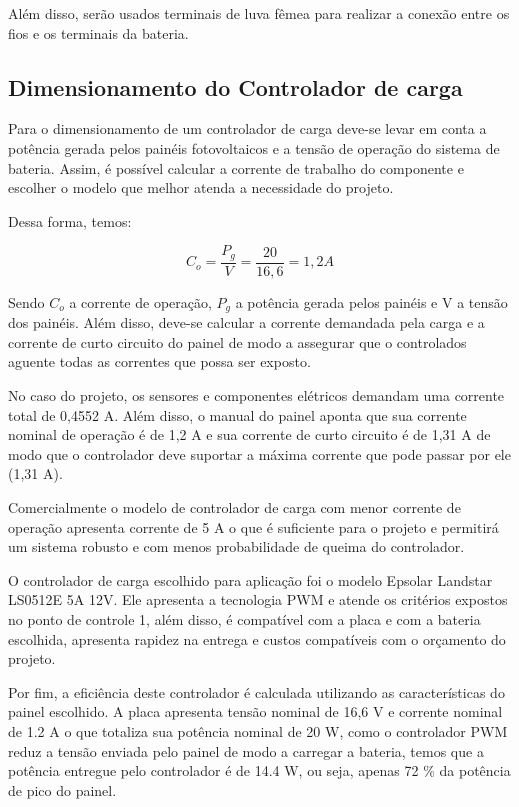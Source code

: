 	Além disso, serão usados terminais de luva fêmea para realizar a conexão entre os fios e os terminais da bateria.

\subsection{Dimensionamento do Controlador de carga}

	Para o dimensionamento de um controlador de carga deve-se levar em conta a potência gerada pelos painéis fotovoltaicos e a tensão de operação do sistema de bateria. Assim, é possível calcular a corrente de trabalho do componente e escolher o modelo que melhor atenda a necessidade do projeto.
	
	Dessa forma, temos:

\begin{equation}
C_o = \dfrac{P_g}{V} = \dfrac{20}{16,6} = 1,2 A
\end{equation}

	Sendo $C_o$ a corrente de operação, $P_g$ a potência gerada pelos painéis e V a tensão dos painéis. Além disso, deve-se calcular a corrente demandada pela carga e a corrente de curto circuito do painel de modo a assegurar que o controlados aguente todas as correntes que possa ser exposto.
	
	No caso do projeto, os sensores e componentes elétricos demandam uma corrente total de 0,4552 A. Além disso, o manual do painel aponta que sua corrente nominal de operação é de 1,2 A e sua corrente de curto circuito é de 1,31 A de modo que o controlador deve suportar a máxima corrente que pode passar por ele (1,31 A).
	
	Comercialmente o modelo de controlador de carga com menor corrente de operação apresenta corrente de 5 A o que é suficiente para o projeto e permitirá um sistema robusto e com menos probabilidade de queima do controlador.
	
	O controlador de carga escolhido para aplicação foi o modelo Epsolar Landstar LS0512E 5A 12V. Ele apresenta a tecnologia PWM e atende os critérios expostos no ponto de controle 1, além disso, é compatível com a placa e com a bateria escolhida, apresenta rapidez na entrega e custos compatíveis com o orçamento do projeto.
	
	Por fim, a eficiência deste controlador é calculada utilizando as características do painel escolhido. A placa apresenta tensão nominal de 16,6 V e corrente nominal de 1.2 A o que totaliza sua potência nominal de 20 W, como o controlador PWM reduz a tensão enviada pelo painel de modo a carregar a bateria, temos que a potência entregue pelo controlador é de 14.4 W, ou seja, apenas 72 \% da potência de pico do painel. 


